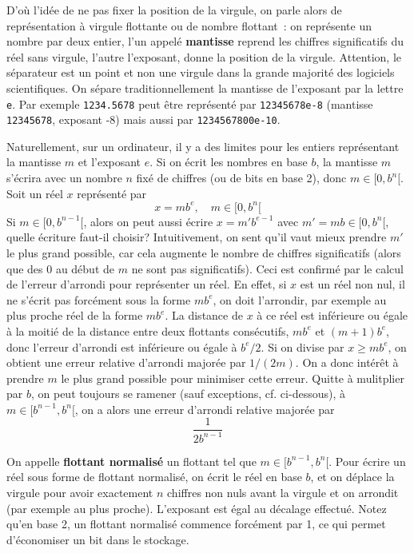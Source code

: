 \documentclass[a4paper,11pt]{article}
\begin{document}
D'o\`u l'id\'ee de ne pas fixer la position de la virgule, on parle
alors de repr\'esentation \`a virgule flottante ou de nombre flottant~: on
repr\'esente un nombre par deux entier, l'un appel\'e {\bf mantisse}
reprend les chiffres significatifs du r\'eel sans virgule, l'autre
l'exposant, donne la position de la virgule. Attention, le séparateur
est un point et non une virgule dans la grande
majorité des logiciels scientifiques.
On s\'epare
traditionnellement la mantisse de l'exposant par la lettre \verb|e|.
Par exemple \verb|1234.5678| peut \^etre repr\'esent\'e 
par \verb|12345678e-8| (mantisse \verb|12345678|, exposant -8)
mais aussi par \verb|1234567800e-10|.

Naturellement, sur un ordinateur, il y a des limites pour les entiers  
repr\'esentant la mantisse $m$ et l'exposant $e$. 
Si on \'ecrit les nombres en base
$b$, la mantisse $m$ s'\'ecrira avec un nombre $n$ fix\'e de chiffres (ou
de bits en base 2), donc $m \in [0,b^n[$. Soit un r\'eel $x$ repr\'esent\'e
par
\[ x=mb^e, \quad m \in [0,b^n[ \]
Si $m\in [0,b^{n-1}[$, alors on peut aussi \'ecrire $x=m' b^{e-1}$ avec
$m'=mb \in [0,b^n[$, quelle \'ecriture faut-il choisir?
Intuitivement, on sent qu'il vaut mieux prendre $m'$ le plus grand
possible, car cela augmente le nombre de chiffres significatifs (alors
que des 0 au d\'ebut de $m$ ne sont pas significatifs).
Ceci est confirm\'e par le calcul de l'erreur d'arrondi pour
repr\'esenter un r\'eel. En effet, si $x$ est un r\'eel non nul, il ne
s'\'ecrit pas forc\'ement sous la forme $mb^e$, on doit l'arrondir,
par exemple au plus proche r\'eel de la forme $mb^e$. La distance
de $x$ \`a ce r\'eel est inf\'erieure ou \'egale \`a la moiti\'e
de la distance entre deux flottants cons\'ecutifs, 
$mb^e$ et $(m+1)b^e$, donc l'erreur d'arrondi
est inf\'erieure ou \'egale \`a $b^e/2$. Si on divise par $x \geq mb^e$,
on obtient une erreur relative d'arrondi major\'ee par $1/(2m)$.
On a donc int\'er\^et \`a prendre $m$ le plus grand possible pour
minimiser cette erreur. Quitte \`a mulitplier par $b$, on peut
toujours se ramener (sauf exceptions, cf. ci-dessous), 
\`a $m \in [b^{n-1},b^n[$, on a alors
une erreur d'arrondi relative major\'ee par
\[ \frac{1}{2b^{n-1}}\]

On appelle {\bf flottant normalis\'e} un flottant tel que $m \in
[b^{n-1},b^n[$. Pour \'ecrire un r\'eel sous forme de flottant
normalis\'e, on \'ecrit le r\'eel en base $b$, et on d\'eplace
la virgule pour avoir exactement $n$ chiffres non nuls avant la
virgule et on arrondit (par exemple au plus proche). 
L'exposant est \'egal au d\'ecalage effectu\'e.
Notez qu'en base 2, un flottant normalisé commence forcément
par 1, ce qui permet d'économiser un bit dans le stockage.
\end{document}
